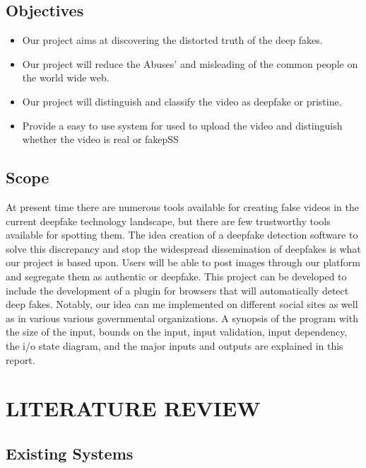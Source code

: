 \documentclass[12 pt]{article}
\begin{document}
\subsection{Objectives}
\justify
\begin{itemize}
    \item Our project aims at discovering the distorted truth of the deep fakes.
    \item Our project will reduce the Abuses’ and misleading of the common people on
          the world wide web.
    \item Our project will distinguish and classify the video as deepfake or pristine.
    \item Provide a easy to use system for used to upload the video and distinguish
          whether the video is real or fakepSS
\end{itemize}

\subsection{Scope}
At present time there are numerous tools available for creating false videos in the current deepfake technology landscape, but there are few trustworthy tools available for spotting them. The idea creation of a deepfake detection software to solve this discrepancy and stop the widespread dissemination of deepfakes is what our project is based upon. Users will be able to post images through our platform and segregate them as authentic or deepfake. This project can be developed to include the development of a plugin for browsers that will automatically detect deep fakes. Notably, our idea can me implemented on different social sites as well as in various various governmental organizations. A synopsis of the program with the size of the input, bounds on the input, input validation, input dependency, the i/o state diagram, and the major inputs and outputs are explained in this report.
\newpage
\newpage


\section{LITERATURE REVIEW}
\newpage
\subsection{Existing Systems}
\newpage
\end{document}
